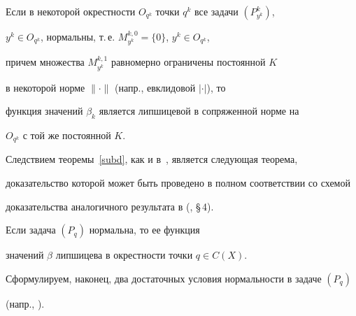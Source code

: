 \begin{cors}\label{lip}


Если в некоторой окрестности $O_{q^k}$ точки $q^k$ все задачи $(P^k_{y^k})$,


$y^k\in O_{q^k}$, нормальны, т.\,е. $M^{k, 0}_{y^k}=\{0\}$, $y^k\in O_{q^k}$,


причем множества $M^{k, 1}_{y^k}$ равномерно ограничены постоянной $K$ 


в некоторой норме $\|\cdot\|$ (напр., евклидовой $|\cdot|$), то 


функция значений $\beta_k$ является липшицевой в сопряженной норме на


$O_{q^k}$ с той же постоянной $K$.


\end{cors}





Следствием теоремы~\ref{subd}, как и в~\cite{sumin00c}, является следующая теорема,


доказательство которой может быть проведено в полном соответствии со схемой


доказательства аналогичного результата в (\cite{sumin00c}, \S\,4).








\begin{thms}


Если задача $(P_q)$ нормальна, то ее функция


значений $\beta$ липшицева в окрестности точки $q\in C(X)$.


\end{thms}





Сформулируем, наконец, два достаточных условия нормальности в задаче $(P_q)$


(напр., \cite{sumin00b}).








